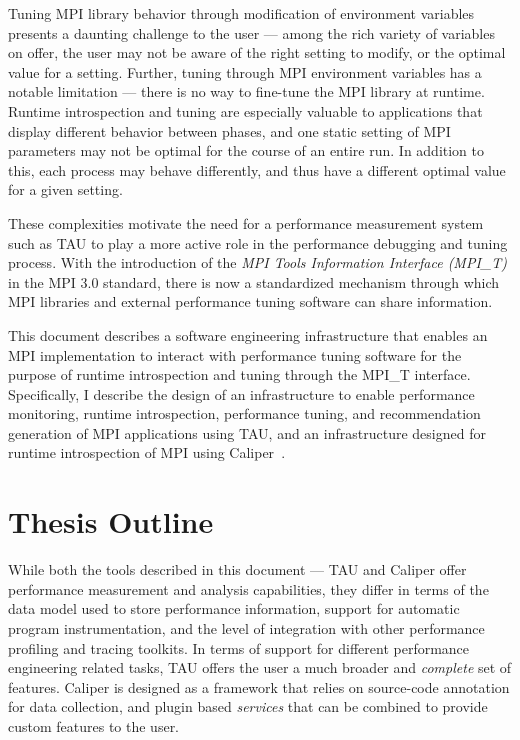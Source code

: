Tuning MPI library behavior through modification of environment variables presents a daunting challenge to the user --- among the rich variety of variables on offer, the user may not be aware of the right setting to modify, or the optimal value for a setting. Further, tuning through MPI environment variables has a notable limitation --- there is no way to fine-tune the MPI library at runtime. Runtime introspection and tuning are especially valuable to applications that display different behavior between phases, and one static setting of MPI parameters may not be optimal for the course of an entire run. In addition to this, each process may behave differently, and thus have a different optimal value for a given setting. \par
These complexities motivate the need for a performance measurement system such as TAU to play a more active role in the performance debugging and tuning process. With the introduction of the \textit{MPI Tools Information Interface (MPI\_T)} in the MPI 3.0 standard, there is now a standardized mechanism through which MPI libraries and external performance tuning software can share information. 
\par This document describes a software engineering infrastructure that enables an MPI implementation to interact with performance tuning software for the purpose of runtime introspection and tuning through the MPI\_T interface. Specifically, I describe the design of an infrastructure to enable performance monitoring, runtime introspection, performance tuning, and recommendation generation of MPI applications using TAU, and an infrastructure designed for runtime introspection of MPI using Caliper~\cite{CALIPER}.

\section {Thesis Outline}
While both the tools described in this document --- TAU and Caliper offer performance measurement and analysis capabilities, they differ in terms of the data model used to store performance information, support for automatic program instrumentation, and the level of integration with other performance profiling and tracing toolkits. In terms of support for different performance engineering related tasks, TAU offers the user a much broader and \textit{complete} set of features. Caliper is designed as a framework that relies on source-code annotation for data collection, and plugin based \textit{services} that can be combined to provide custom features to the user.

